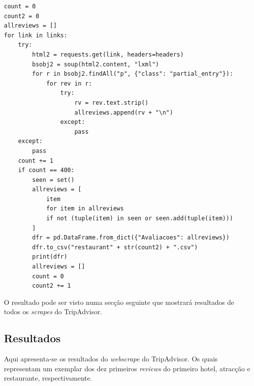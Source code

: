 \documentclass[a4paper,10pt]{article}
\begin{document}
\begin{verbatim}
count = 0
count2 = 0
allreviews = []
for link in links:
    try:
        html2 = requests.get(link, headers=headers)
        bsobj2 = soup(html2.content, "lxml")
        for r in bsobj2.findAll("p", {"class": "partial_entry"}):
            for rev in r:
                try:
                    rv = rev.text.strip()
                    allreviews.append(rv + "\n")
                except:
                    pass
    except:
        pass
    count += 1
    if count == 400:
        seen = set()
        allreviews = [
            item
            for item in allreviews
            if not (tuple(item) in seen or seen.add(tuple(item)))
        ]
        dfr = pd.DataFrame.from_dict({"Avaliacoes": allreviews})
        dfr.to_csv("restaurant" + str(count2) + ".csv")
        print(dfr)
        allreviews = []
        count = 0
        count2 += 1
\end{verbatim}

O resultado pode ser visto numa secção seguinte que mostrará resultados de todos os \textit{scrapes} do TripAdvisor.

\newpage

\subsection{Resultados}

Aqui apresenta-se os resultados do \textit{webscrape} do TripAdvisor. Os quais representam um exemplar dos dez primeiros \textit{reviews} do primeiro hotel, atracção e restaurante, respectivamente.
\end{document}
